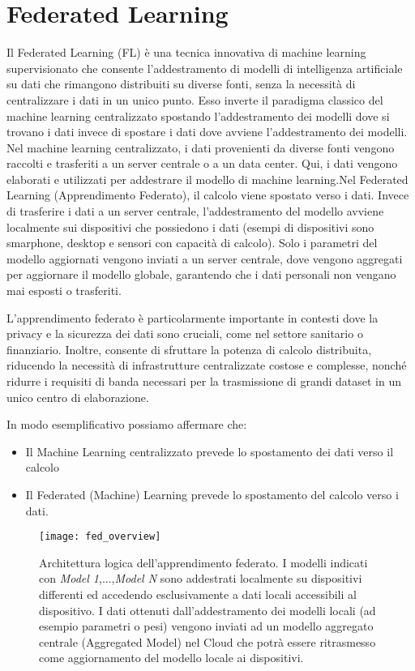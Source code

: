 \documentclass[a4paper, oneside, openright]{report}
\let\oldsection\section
\renewcommand{\section}{\newpage\oldsection}
\begin{document}
\section{Federated Learning}
Il Federated Learning (FL) è una tecnica innovativa di machine learning supervisionato che consente l'addestramento di modelli di intelligenza artificiale su dati che rimangono distribuiti su diverse fonti, senza la necessità di centralizzare i dati in un unico punto. Esso inverte il paradigma classico del machine learning centralizzato spostando l'addestramento dei modelli dove si trovano i dati invece di spostare i dati dove avviene l'addestramento dei modelli. 
Nel machine learning centralizzato, i dati provenienti da diverse fonti vengono raccolti e trasferiti a un server centrale o a un data center. Qui, i dati vengono elaborati e utilizzati per addestrare il modello di machine learning.Nel Federated Learning (Apprendimento Federato), il calcolo viene spostato verso i dati. Invece di trasferire i dati a un server centrale, l'addestramento del modello avviene localmente sui dispositivi che possiedono i dati (esempi di dispositivi sono smarphone, desktop e sensori con capacità di calcolo). Solo i parametri del modello aggiornati vengono inviati a un server centrale, dove vengono aggregati per aggiornare il modello globale, garantendo che i dati personali non vengano mai esposti o trasferiti.

L'apprendimento federato è particolarmente importante in contesti dove la privacy e la sicurezza dei dati sono cruciali, come nel settore sanitario o finanziario. Inoltre, consente di sfruttare la potenza di calcolo distribuita, riducendo la necessità di infrastrutture centralizzate costose e complesse, nonché ridurre i requisiti di banda necessari per la trasmissione di grandi dataset in un unico centro di elaborazione. 

In modo esemplificativo possiamo affermare che: 
\begin{itemize}
    \item Il Machine Learning centralizzato prevede lo spostamento dei dati verso il calcolo
    \item Il Federated (Machine) Learning prevede lo spostamento del calcolo verso i dati.
\end{itemize}



\begin{figure}[h]
\centering
\texttt{[image: fed\_overview]}
\caption{Architettura logica dell'apprendimento federato. I modelli indicati con \textit{Model 1},...,\textit{Model N} sono addestrati localmente su dispositivi differenti ed accedendo esclusivamente a dati locali accessibili al dispositivo. I dati ottenuti dall'addestramento dei modelli locali (ad esempio parametri o pesi) vengono inviati ad un modello aggregato centrale (Aggregated Model) nel Cloud che potrà essere ritrasmesso come aggiornamento del modello locale ai dispositivi. \label{fig:architetturaFL}}
\end{figure}
\end{document}
